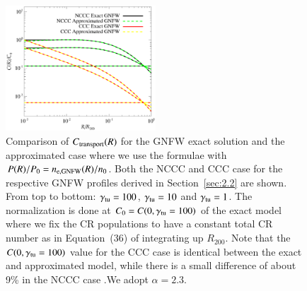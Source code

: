\documentclass[traditabstract]{aa}
\begin{document}
\begin{appendix}
\begin{figure}[hbt!]
\centering
\includegraphics[width=0.5\textwidth]{figures/CR_profiles_REXexactVSfake.eps}
\caption{Comparison of $C_{\rm{transport}}(R)$ for the GNFW exact solution and the approximated case where we use the \cite{2011A&A...527A..99E} formulae with $P(R)/P_{0}=n_{\rm{e,GNFW}}(R)/n_{0}$. Both the NCCC and CCC case for the respective GNFW profiles derived in Section~\ref{sec:2.2} are shown. From top to bottom: $\gamma_{\rm{tu}}=100$, $\gamma_{\rm{tu}}=10$ and $\gamma_{\rm{tu}}=1$. The normalization is done at $C_{0}=C(0,\gamma_{\rm{tu}}=100)$ of the exact model where we fix the CR populations to have a constant total CR number as in Equation~(36) of \cite{2011A&A...527A..99E} integrating up $R_{200}$. Note that the $C(0,\gamma_{\rm{tu}}=100)$ value for the CCC case is identical between the exact and approximated model, while there is a small difference of about 9\% in the NCCC case .We adopt $\alpha=2.3$.}
\label{fig:REXexactVSfake}
\end{figure}

\end{appendix}
\end{document}
